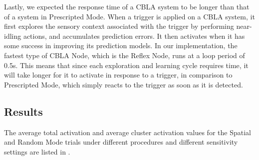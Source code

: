 Lastly, we expected the response time of a CBLA system to be longer than that of a system in Prescripted Mode. When a trigger is applied on a CBLA system, it first explores the sensory context associated with the trigger by performing near-idling actions, and accumulates prediction errors. It then activates when it has some success in improving its prediction models. In our implementation, the fastest type of CBLA Node, which is the Reflex Node, runs at a loop period of 0.5s. This means that since each exploration and learning cycle requires time, it will take longer for it to activate in response to a trigger, in comparison to Prescripted Mode, which simply reacts to the trigger as soon as it is detected.


\subsection{Results}

The average total activation and average cluster activation values for the Spatial and Random Mode trials under different procedures and different sensitivity settings are listed in . 

